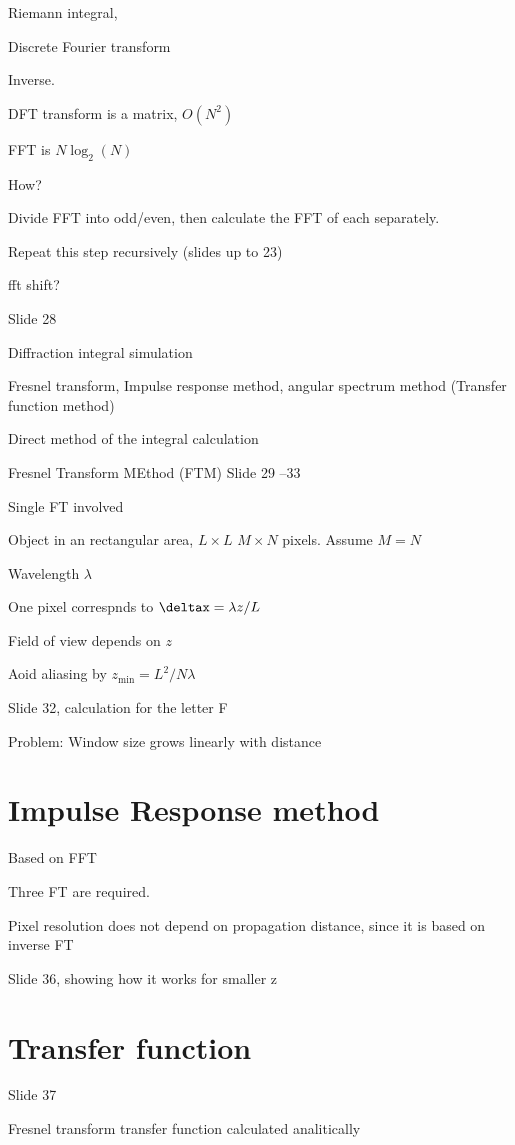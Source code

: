 \documentclass[../main/main.tex]{subfiles}
\begin{document}
Riemann integral,

Discrete Fourier transform

Inverse.

DFT transform is a matrix, $O(N^2)$

FFT is $N \log_2(N)$


How?

Divide FFT into odd/even, then calculate the FFT of each separately.

Repeat this step recursively (slides up to 23)

fft shift?


Slide 28

Diffraction integral simulation

Fresnel transform, Impulse response method, angular spectrum method (Transfer function method)

Direct method of the integral calculation

Fresnel Transform MEthod (FTM)
Slide 29 --33

Single FT involved

Object in an rectangular area, $L \times  L$ $M \times N$ pixels. Assume $M=N$

Wavelength $\lambda$

One pixel correspnds to $\deltax = \lambda z / L$

Field of view depends on $z$

Aoid aliasing by $z_{\min} = L^2/ N \lambda$

Slide 32, calculation for the letter F

Problem: Window size grows linearly with distance


\section{Impulse Response method}

Based on FFT

Three FT are required.

Pixel resolution does not depend on propagation distance, since it is based on inverse FT

Slide 36, showing how it works for smaller z


\section{Transfer function}

Slide 37

Fresnel transform transfer function calculated analitically
\end{document}
